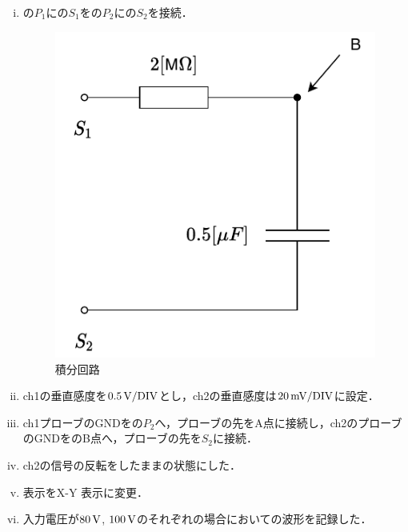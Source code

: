 \begin{enumerate}[(a)]
\begin{enumerate}[i)]
	\item {}の$P_{1}$にの$S_{1}$をの$P_{2}$にの$S_{2}$を接続．
	\begin{figure}[h]
	\centering
	\includegraphics[scale=1]{./fig/ad.pdf}
	\caption{積分回路}
	\label{fig:ad}
	\end{figure}
	\item ch1の垂直感度を$0.5\,\rm{V/DIV}$とし，ch2の垂直感度は$20\,\rm{mV/DIV}$に設定．
	\item ch1プローブのGNDをの$P_{2}$へ，プローブの先をA点に接続し，ch2のプローブのGNDをのB点へ，プローブの先を$S_{2}$に接続．
	\item ch2の信号の反転をしたままの状態にした．
	\item 表示をX-Y 表示に変更．
	\item 入力電圧が$80\,\rm{V}$, $100\,\rm{V}$のそれぞれの場合においての波形を記録した．
\end{enumerate}
\end{enumerate}
